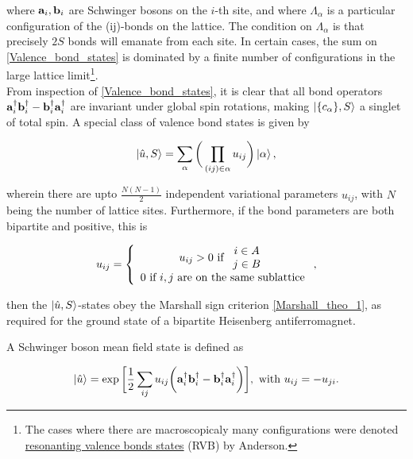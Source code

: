where ${\bf a}_i, {\bf b}_i$ are Schwinger bosons on the $i$-th site, and where $\Lambda_{\alpha}$ is a particular configuration of the (ij)-bonds on the lattice. The condition on $\Lambda_{\alpha}$ is that precisely $2S$ bonds will emanate from each site. In certain cases, the sum on 
\cref{Valence_bond_states} is dominated by a finite number of configurations in the large lattice limit\footnote{

The cases where there are macroscopicaly many configurations were denoted \underline{resonanting valence bonds states} (RVB) by Anderson.

}. \\

From inspection of \cref{Valence_bond_states}, it is clear that all bond operators ${\bf a}_i^\dagger {\bf b}_i^\dagger - {\bf b}_i^\dagger {\bf a}_i^\dagger$ are invariant under global spin rotations, making $\ket{\{c_{\alpha}\}, S}$ a singlet of total spin. A special class of valence bond states is given by 

\begin{equation}
    \ket{\hat{u}, S} = \sum_{\alpha} \bigg(\prod_{(ij) \in \alpha} u_{ij}\bigg) \ket{\alpha},
    \label{special_class_Valence_bond_states }
\end{equation}

wherein there are upto $\frac{N(N-1)}{2}$ independent variational parameters $u_{ij}$, with $N$ being the number of lattice sites. Furthermore, if the bond parameters are both bipartite and positive, this is 

\begin{equation}
    u_{ij} = \left\{\begin{array}{c}
       u_{ij} > 0  \textnormal{ if } \begin{array}{c}
            i \in A  \\
            j \in B
       \end{array}  \\
       0 \textnormal{ if $i,j$ are on the same sublattice}
    \end{array}\right.,
\end{equation}

then the $\ket{\hat{u}, S}$-states obey the Marshall sign criterion \cref{Marshall_theo_1}, as required for the ground state of a bipartite Heisenberg antiferromagnet. 

\clearpage 

A Schwinger boson mean field state is defined as 

\begin{equation}
    \ket{\hat{u}} = \exp \bigg[\frac{1}{2} \sum_{ij} u_{ij} \bigg({\bf a}_i^\dagger {\bf b}_i^\dagger - {\bf b}_i^\dagger {\bf a}_i^\dagger\bigg)\bigg], \textnormal{ with } u_{ij} = -u_{ji}.
    \label{Schwinger_mean_field_state}
\end{equation}

